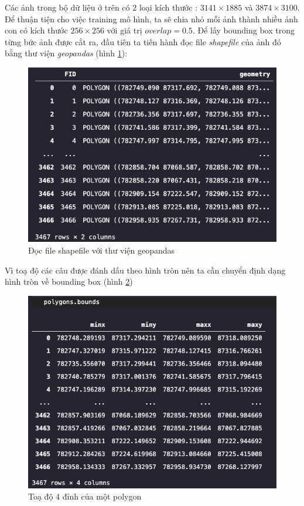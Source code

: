 \documentclass[a4paper, 12pt]{report}
\begin{document}
\begin{enumerate}[label= \textit{\alph*)}]
%
\newpage
Các ảnh trong bộ dữ liệu ở trên có 2 loại kích thước : $3141 \times 1885$ và $3874 \times 3100$.  Để thuận tiện cho việc training mô hình,  ta sẽ chia nhỏ mỗi ảnh thành nhiều ảnh con có kích thước $256 \times 256$ với giá trị $overlap = 0.5$.  Để lấy bounding box trong từng bức ảnh được cắt ra,  đầu tiên ta tiến hành đọc file \textit{shapefile} của ảnh đó bằng thư viện \textit{geopandas} (hình \ref{fig:polygon_ori}): 

 \begin{figure}[!h]
	\centering
	\includegraphics[width=1\linewidth]{Images/polygon_ori}
	\caption{Đọc file shapefile với thư viện geopandas}
	\label{fig:polygon_ori}
\end{figure}
Vì toạ độ các câu được đánh dấu theo hình tròn nên ta cần chuyển định dạng hình tròn về bounding box (hình \ref{fig:polygon_bounds})

 \begin{figure}[!h]
	\centering
	\includegraphics[width=1\linewidth]{Images/polygon_bounds}
	\caption{Toạ độ 4 đỉnh của một polygon}
	\label{fig:polygon_bounds}
\end{figure}



\end{enumerate}
\end{document}
